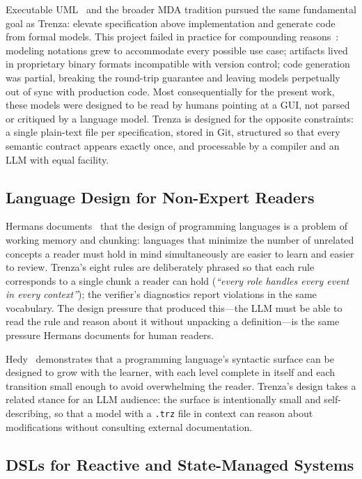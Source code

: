 Executable UML~\cite{mellor2002xuml} and the broader MDA tradition pursued the
same fundamental goal as Trenza: elevate specification above implementation and
generate code from formal models. This project failed in practice for
compounding reasons~\cite{mernik2005when}: modeling notations grew to
accommodate every possible use case; artifacts lived in proprietary binary
formats incompatible with version control; code generation was partial, breaking
the round-trip guarantee and leaving models perpetually out of sync with
production code. Most consequentially for the present work, these models were
designed to be read by humans pointing at a GUI, not parsed or critiqued by a
language model. Trenza is designed for the opposite constraints: a single
plain-text file per specification, stored in Git, structured so that every
semantic contract appears exactly once, and processable by a compiler and an LLM
with equal facility.

\subsection{Language Design for Non-Expert Readers}

Hermans documents~\cite{hermans2021brain} that the design of programming
languages is a problem of working memory and chunking: languages that minimize
the number of unrelated concepts a reader must hold in mind simultaneously are
easier to learn and easier to review. Trenza's eight rules are deliberately
phrased so that each rule corresponds to a single chunk a reader can hold
(\emph{``every role handles every event in every context''}); the verifier's
diagnostics report violations in the same vocabulary. The design pressure that
produced this---the LLM must be able to read the rule and reason about it
without unpacking a definition---is the same pressure Hermans documents for
human readers.

Hedy~\cite{hermans2020hedy} demonstrates that a programming language's syntactic
surface can be designed to grow with the learner, with each level complete in
itself and each transition small enough to avoid overwhelming the reader.
Trenza's design takes a related stance for an LLM audience: the surface is
intentionally small and self-describing, so that a model with a \texttt{.trz}
file in context can reason about modifications without consulting external
documentation.

\subsection{DSLs for Reactive and State-Managed Systems}

